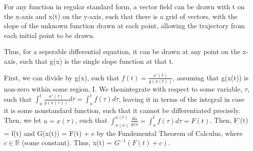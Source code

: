 \documentclass[11 pt, twoside]{article}
\begin{document}
For any function in regular standard form, a vector field can be drawn with t on the x-axis and x(t) on the y-axis, such that there is a grid of vectors, with the slope of the unknown function drawn at each point, allowing the trajectory from each initial point to be drawn.

Thus, for a seperable differential equation, it can be drawn at any point on the x-axis, such that g(x) is the single slope function at that t.

First, we can divide by g(x), such that $f(t) = \frac{x'(t)}{g(x(t))}$, assuming that g(x(t)) is non-zero within some region, I. We thenintegrate with respect to some variable, $\tau$, such that $\int^t_a \frac{x'(\tau)}{g(x(\tau))}d\tau = \int^t_a f(\tau)d\tau$, leaving it in terms of the integral in case it is some nonstandard function, such that it cannot be differentiated precisely. Then, we let $u = x(\tau)$, such that $\int^{x(t)}_{x(a)} \frac{du}{g(u} = \int^t_a f(\tau)d\tau = F(t)$. Then, F'(t) = f(t) and G(x(t)) = F(t) + c by the Fundemental Theorem of Calculus, where $c \in \mathbb{R}$ (some constant). Thus, x(t) = $G^{-1}(F(t) + c)$.
\end{document}
